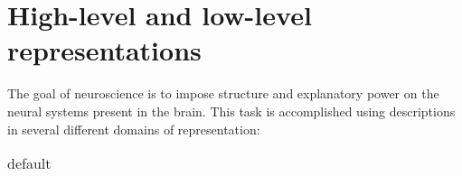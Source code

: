 \section{High-level and low-level representations}

The goal of neuroscience is to impose structure and explanatory power on the neural systems present in the brain. This task is accomplished using descriptions in several different domains of representation:

\begin{table}[htdp]
\caption{default}
\begin{center}
\begin{tabular}{|c|c|}

\end{tabular}
\end{center}
\label{default}
\end{table}%
